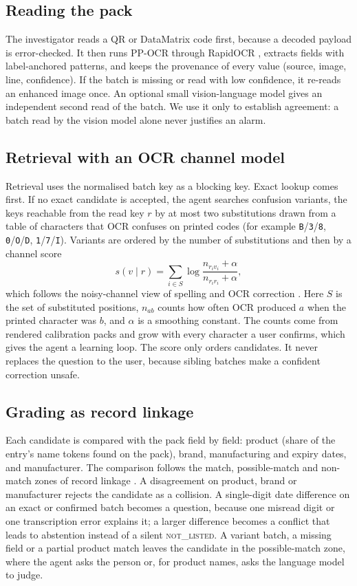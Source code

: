 \subsection{Reading the pack}
The investigator reads a QR or DataMatrix code first, because a decoded payload is error-checked. It then runs PP-OCR through RapidOCR \cite{du2020ppocr,rapidai2021rapidocr}, extracts fields with label-anchored patterns, and keeps the provenance of every value (source, image, line, confidence). If the batch is missing or read with low confidence, it re-reads an enhanced image once. An optional small vision-language model gives an independent second read of the batch. We use it only to establish agreement: a batch read by the vision model alone never justifies an alarm.

\subsection{Retrieval with an OCR channel model}
Retrieval uses the normalised batch key as a blocking key. Exact lookup comes first. If no exact candidate is accepted, the agent searches confusion variants, the keys reachable from the read key $r$ by at most two substitutions drawn from a table of characters that OCR confuses on printed codes (for example \texttt{B}/\texttt{3}/\texttt{8}, \texttt{0}/\texttt{O}/\texttt{D}, \texttt{1}/\texttt{7}/\texttt{I}). Variants are ordered by the number of substitutions and then by a channel score
\begin{equation}
s(v \mid r) = \sum_{i \in S} \log \frac{n_{r_i v_i} + \alpha}{n_{r_i r_i} + \alpha},
\label{eq:channel}
\end{equation}
which follows the noisy-channel view of spelling and OCR correction \cite{kernighan1990spelling,brill2000improved,kolak2002ocr}. Here $S$ is the set of substituted positions, $n_{ab}$ counts how often OCR produced $a$ when the printed character was $b$, and $\alpha$ is a smoothing constant. The counts come from rendered calibration packs and grow with every character a user confirms, which gives the agent a learning loop. The score only orders candidates. It never replaces the question to the user, because sibling batches make a confident correction unsafe.

\subsection{Grading as record linkage}
Each candidate is compared with the pack field by field: product (share of the entry's name tokens found on the pack), brand, manufacturing and expiry dates, and manufacturer. The comparison follows the match, possible-match and non-match zones of record linkage \cite{fellegi1969theory}. A disagreement on product, brand or manufacturer rejects the candidate as a collision. A single-digit date difference on an exact or confirmed batch becomes a question, because one misread digit or one transcription error explains it; a larger difference becomes a conflict that leads to abstention instead of a silent \textsc{not\_listed}. A variant batch, a missing field or a partial product match leaves the candidate in the possible-match zone, where the agent asks the person or, for product names, asks the language model to judge.

